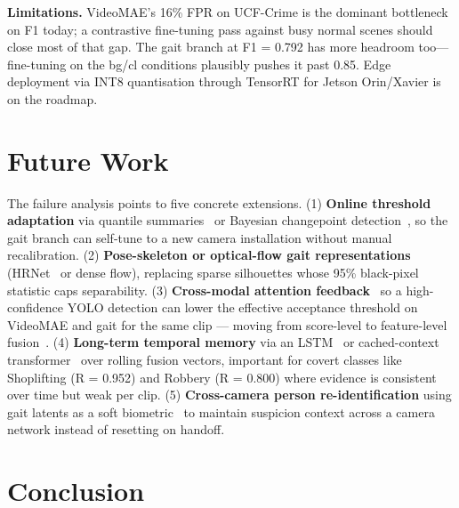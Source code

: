 \documentclass[runningheads]{llncs}
\begin{document}
\begin{algorithm}[!htbp]
\textbf{Limitations.} VideoMAE's 16\% FPR on UCF-Crime is the dominant bottleneck on F1 today; a contrastive fine-tuning pass against busy normal scenes should close most of that gap. The gait branch at F1 = 0.792 has more headroom too—fine-tuning on the bg/cl conditions plausibly pushes it past 0.85. Edge deployment via INT8 quantisation through TensorRT for Jetson Orin/Xavier is on the roadmap.

\section{Future Work}\label{sec:future}

The failure analysis points to five concrete extensions. (1) \textbf{Online threshold adaptation} via quantile summaries~\cite{greenwald2001} or Bayesian changepoint detection~\cite{adams2007}, so the gait branch can self-tune to a new camera installation without manual recalibration. (2) \textbf{Pose-skeleton or optical-flow gait representations} (HRNet~\cite{sun2019hrnet} or dense flow), replacing sparse silhouettes whose 95\% black-pixel statistic caps separability. (3) \textbf{Cross-modal attention feedback}~\cite{tsai2019multimodal} so a high-confidence YOLO detection can lower the effective acceptance threshold on VideoMAE and gait for the same clip --- moving from score-level to feature-level fusion~\cite{vaswani2017attention}. (4) \textbf{Long-term temporal memory} via an LSTM~\cite{hochreiter1997lstm} or cached-context transformer~\cite{dai2019transformerxl} over rolling fusion vectors, important for covert classes like Shoplifting (R = 0.952) and Robbery (R = 0.800) where evidence is consistent over time but weak per clip. (5) \textbf{Cross-camera person re-identification} using gait latents as a soft biometric~\cite{ye2021deep,chao2019gaitset} to maintain suspicion context across a camera network instead of resetting on handoff.

\section{Conclusion}\label{sec:conc}


\end{algorithm}
\end{document}
